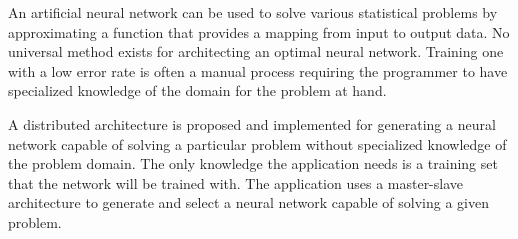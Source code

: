 \begin{thesisabstract}
An artificial neural network can be used to solve various statistical problems by approximating a function that provides a mapping from input to output data. No universal method exists for architecting an optimal neural network. Training one with a low error rate is often a manual process requiring the programmer to have specialized knowledge of the domain for the problem at hand.  

A distributed architecture is proposed and implemented for generating a neural network capable of solving a particular problem without specialized knowledge of the problem domain.  The only knowledge the application needs is a training set that the network will be trained with. The application uses a master-slave architecture to generate and select a neural network capable of solving a given problem.  
\end{thesisabstract}

